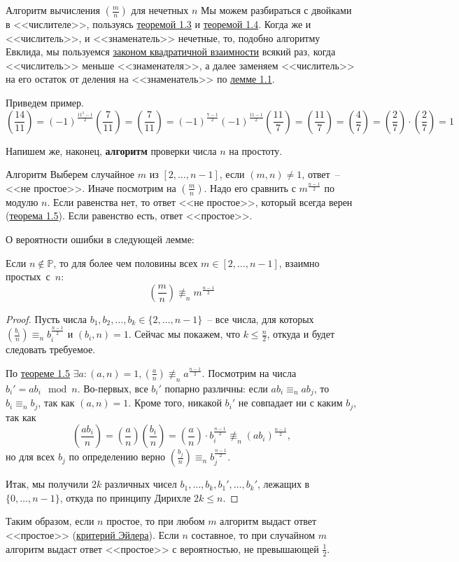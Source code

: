 \begin{algodescription}{Алгоритм вычисления $\left(\frac{m}{n}\right)$ для нечетных $n$} 
Мы можем разбираться с двойками в <<числителе>>, пользуясь \hyperlink{multiplicative}{теоремой 1.3} и \hyperlink{twojacobi}{теоремой 1.4}. Когда же и <<числитель>>, и <<знаменатель>> нечетные, то, подобно алгоритму Евклида, мы пользуемся \hyperlink{qreciproc}{законом квадратичной взаимности} всякий раз, когда <<числитель>> меньше <<знаменателя>>, а далее заменяем <<числитель>>  на его остаток от деления на <<знаменатель>> по \hyperlink{aequivb}{лемме 1.1}.
\end{algodescription}

Приведем пример.
$$\left(\frac{14}{11}\right) = (-1)^\frac{11^2-1}{2}\left(\frac{7}{11}\right) = \left(\frac{7}{11}\right) = (-1)^\frac{7-1}{2}(-1)^\frac{11-1}{2}\left(\frac{11}{7}\right) = \left(\frac{11}{7}\right) = \left(\frac{4}{7}\right) = \left(\frac{2}{7}\right)\cdot\left(\frac{2}{7}\right) = 1$$

Напишем же, наконец, \textbf{алгоритм} проверки числа $n$ на простоту. 

\begin{algodescription}{Алгоритм}
    Выберем случайное $m$ из $[2,\ldots,n-1]$, если $(m,n)\ne 1$, ответ~-- <<не простое>>. Иначе посмотрим на $\left(\frac{m}{n}\right)$. Надо его сравнить с $m^{\frac{n-1}{2}}$ по модулю $n$. Если равенства нет, то ответ <<не простое>>, который всегда верен (\hyperlink{solovaytest}{теорема 1.5}). Если равенство есть, ответ <<простое>>.
\end{algodescription} 

О вероятности ошибки в следующей лемме:
\begin{lemma} Если $n\not\in\mathbb{P}$, то для более чем половины всех $m \in [2, \ldots, n-1]$, взаимно простых~с~$n$: $$\left(\frac{m}{n}\right)\not\equiv_n m^{\frac{n-1}{2}}$$
\end{lemma}
\begin{proof}
Пусть числа $b_1, b_2, \ldots, b_k \in \{2, \ldots, n-1\}$~-- все числа, для которых $\left(\frac{b_i}{n}\right)\equiv_n b_i^\frac{n-1}{2}$ и $(b_i,n)=1$. Сейчас мы покажем, что $k \leq \frac{n}{2}$, откуда и будет следовать требуемое.

По \hyperlink{solovaytest}{теореме 1.5} $\exists a: (a,n)=1, (\frac{a}{n})\not\equiv_n a^\frac{n-1}{2}$. Посмотрим на  числа $b_i' = ab_i \mod {n}$. Во-первых, все $b_i'$ попарно различны: если $ab_i \equiv_n ab_j$, то $b_i \equiv_n b_j$, так как $(a,n)=1$. Кроме того, никакой $b_i'$ не совпадает ни с каким $b_j$, так как
$$\left(\frac{ab_i}{n}\right)=\left(\frac{a}{n}\right)\left(\frac{b_i}{n}\right)=\left(\frac{a}{n}\right)\cdot b_i^\frac{n-1}{2}\not\equiv_n (ab_i)^\frac{n-1}{2},$$
но для всех $b_j$ по определению верно $\left(\frac{b_j}{n}\right) \equiv_n b_j^\frac{n-1}{2}$.

Итак, мы получили $2k$ различных чисел $b_1, \ldots, b_k, b_1', \ldots, b_k'$, лежащих в $\{0, \ldots, n-1\}$, откуда по принципу Дирихле $2k \leq n$.
\end{proof}

Таким образом, если $n$ простое, то при любом $m$ алгоритм выдаст ответ <<простое>> (\hyperlink{euler}{критерий Эйлера}). Если $n$ составное, то при случайном $m$ алгоритм выдаст ответ <<простое>> с вероятностью, не превышающей $\frac{1}{2}$.
